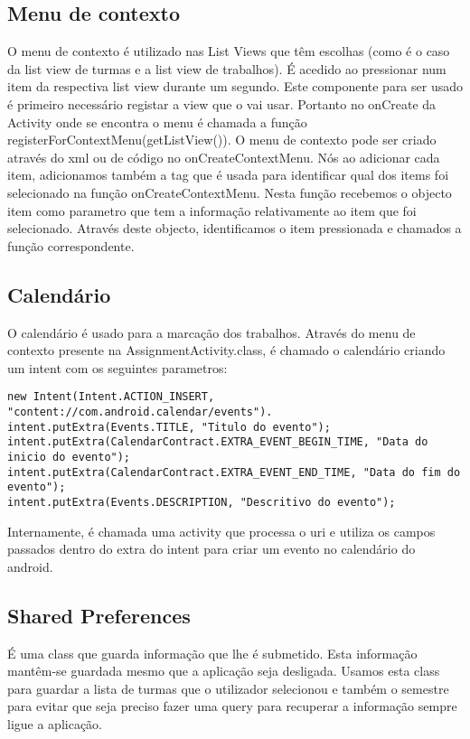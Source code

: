 \documentclass{article}
\begin{document}
\subsection{Menu de contexto}
O menu de contexto é utilizado nas List Views que têm escolhas (como é o caso da list view de turmas e a list view de trabalhos). É acedido ao pressionar num item da respectiva list view durante um segundo.
Este componente para ser usado é primeiro necessário registar a view que o vai usar. Portanto no onCreate da Activity onde se encontra o menu é chamada a função registerForContextMenu(getListView()).
O menu de contexto pode ser criado através do xml ou de código no onCreateContextMenu. Nós ao adicionar cada item, adicionamos também a tag que é usada para identificar qual dos items foi selecionado na função
onCreateContextMenu. Nesta função recebemos o objecto item como parametro que tem a informação relativamente ao item que foi selecionado. Através deste objecto, identificamos o item pressionada e 
chamados a função correspondente.

\subsection{Calendário}
O calendário é usado para a marcação dos trabalhos. Através do menu de contexto presente na AssignmentActivity.class, é chamado o calendário criando um intent com os seguintes parametros:

\begin{lstlisting}
new Intent(Intent.ACTION_INSERT, "content://com.android.calendar/events").
intent.putExtra(Events.TITLE, "Titulo do evento");
intent.putExtra(CalendarContract.EXTRA_EVENT_BEGIN_TIME, "Data do inicio do evento");
intent.putExtra(CalendarContract.EXTRA_EVENT_END_TIME, "Data do fim do evento");
intent.putExtra(Events.DESCRIPTION, "Descritivo do evento");
\end{lstlisting}
Internamente, é chamada uma activity que processa o uri e utiliza os campos passados dentro do extra do intent para criar um evento no calendário do android.

\subsection{Shared Preferences}
É uma class que guarda informação que lhe é submetido. Esta informação mantêm-se guardada mesmo que a aplicação seja desligada. Usamos esta class para guardar  a lista de turmas que o utilizador selecionou
e também o semestre para evitar que seja preciso fazer uma query para recuperar a informação sempre ligue a aplicação.
\end{document}
